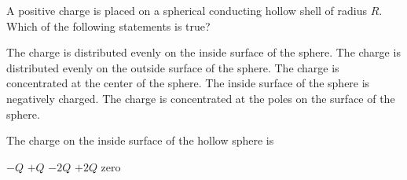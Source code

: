 \documentclass{../../oss-classkick-exam}
\begin{document}
\genheader


\genmultidirections

\raggedcolumns
\begin{questions}
  \begin{multicols*}{2}
    \question A positive charge is placed on a spherical conducting hollow shell
    of radius $R$. Which of the following statements is true?
    \begin{choices}
      \choice The charge is distributed evenly on the inside surface of the
      sphere.
      \choice The charge is distributed evenly on the outside surface of the
      sphere.
      \choice The charge is concentrated at the center of the sphere.
      \choice The inside surface of the sphere is negatively charged.
      \choice The charge is concentrated at the poles on the surface of the
      sphere.
    \end{choices}
    \vspace{.7in}
  

  
    \question The charge on the inside surface of the hollow sphere is
    \begin{choices}
      \choice $-Q$
      \choice $+Q$
      \choice $-2Q$
      \choice $+2Q$
      \choice zero
    \end{choices}
    \label{cond1}
  

\end{multicols*}
\end{questions}
\end{document}
